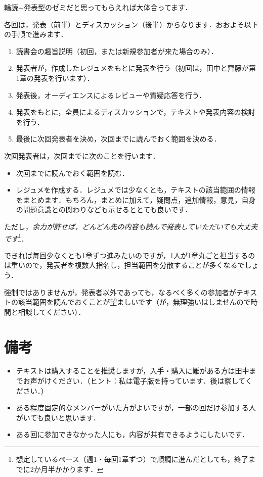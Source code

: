 \documentclass[b5j]{ltjsarticle}
\begin{document}
輪読+発表型のゼミだと思ってもらえれば大体合ってます．

各回は，発表（前半）とディスカッション（後半）からなります．おおよそ以下の手順で進みます．

\begin{enumerate}
  \item 読書会の趣旨説明（初回，または新規参加者が来た場合のみ）．
  \item 発表者が，作成したレジュメをもとに発表を行う（初回は，田中と⿑藤が第1章の発表を行います）．
  \item 発表後，オーディエンスによるレビューや質疑応答を行う．
  \item 発表をもとに，全員によるディスカッションで，テキストや発表内容の検討を行う．
  \item 最後に次回発表者を決め，次回までに読んでおく範囲を決める．
\end{enumerate}

次回発表者は，次回までに次のことを行います．

\begin{itemize}
  \item 次回までに読んでおく範囲を読む．
  \item レジュメを作成する．レジュメでは少なくとも，テキストの該当範囲の情報をまとめます．もちろん，まとめに加えて，疑問点，追加情報，意見，自身の問題意識との関わりなども示せるととても良いです．
\end{itemize}
ただし，\emph{余力が許せば，どんどん先の内容も読んで発表していただいても大丈夫です}\footnote{
  想定しているペース（週1・毎回1章ずつ）で順調に進んだとしても，終了までに2か月半かかります．
}．

できれば毎回少なくとも1章ずつ進みたいのですが，1人が1章丸ごと担当するのは重いので，発表者を複数人指名し，担当範囲を分散することが多くなるでしょう．

強制ではありませんが，発表者以外であっても，なるべく多くの参加者がテキストの該当範囲を読んでおくことが望ましいです（が，無理強いはしませんので時間と相談してください）．

\section{備考}
\label{sec_note}

\begin{itemize}
  \item テキストは購入することを推奨しますが，入手・購入に難がある方は田中までお声がけください．（ヒント：私は電子版を持っています．後は察してください．）
  \item ある程度固定的なメンバーがいた方がよいですが，一部の回だけ参加する人がいても良いと思います．
  \item ある回に参加できなかった人にも，内容が共有できるようにしたいです．
\end{itemize}
\end{document}
